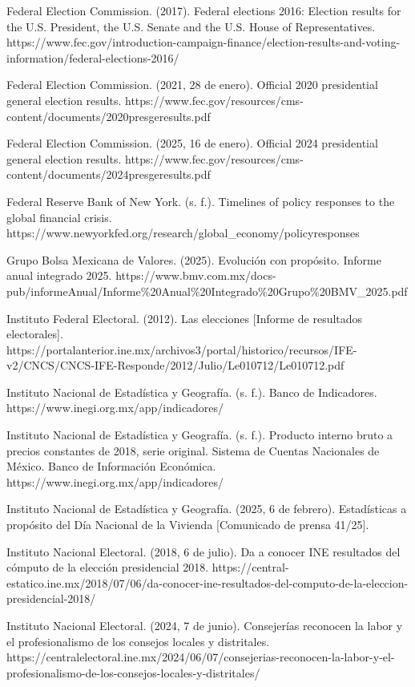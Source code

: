\begin{referencias}
Federal Election Commission. (2017). Federal elections 2016: Election results for the U.S. President, the U.S. Senate and the U.S. House of Representatives. https://www.fec.gov/introduction-campaign-finance/election-results-and-voting-information/federal-elections-2016/

Federal Election Commission. (2021, 28 de enero). Official 2020 presidential general election results. https://www.fec.gov/resources/cms-content/documents/2020presgeresults.pdf

Federal Election Commission. (2025, 16 de enero). Official 2024 presidential general election results. https://www.fec.gov/resources/cms-content/documents/2024presgeresults.pdf

Federal Reserve Bank of New York. (s. f.). Timelines of policy responses to the global financial crisis. https://www.newyorkfed.org/research/global\_economy/policyresponses

Grupo Bolsa Mexicana de Valores. (2025). Evolución con propósito. Informe anual integrado 2025. https://www.bmv.com.mx/docs-pub/informeAnual/Informe\%20Anual\%20Integrado\%20Grupo\%20BMV\_2025.pdf

Instituto Federal Electoral. (2012). Las elecciones {[}Informe de resultados electorales{]}. https://portalanterior.ine.mx/archivos3/portal/historico/recursos/IFE-v2/CNCS/CNCS-IFE-Responde/2012/Julio/Le010712/Le010712.pdf

Instituto Nacional de Estadística y Geografía. (s. f.). Banco de Indicadores. https://www.inegi.org.mx/app/indicadores/

Instituto Nacional de Estadística y Geografía. (s. f.). Producto interno bruto a precios constantes de 2018, serie original. Sistema de Cuentas Nacionales de México. Banco de Información Económica. https://www.inegi.org.mx/app/indicadores/

Instituto Nacional de Estadística y Geografía. (2025, 6 de febrero). Estadísticas a propósito del Día Nacional de la Vivienda {[}Comunicado de prensa 41/25{]}.

Instituto Nacional Electoral. (2018, 6 de julio). Da a conocer INE resultados del cómputo de la elección presidencial 2018. https://central-estatico.ine.mx/2018/07/06/da-conocer-ine-resultados-del-computo-de-la-eleccion-presidencial-2018/

Instituto Nacional Electoral. (2024, 7 de junio). Consejerías reconocen la labor y el profesionalismo de los consejos locales y distritales. https://centralelectoral.ine.mx/2024/06/07/consejerias-reconocen-la-labor-y-el-profesionalismo-de-los-consejos-locales-y-distritales/


\end{referencias}

